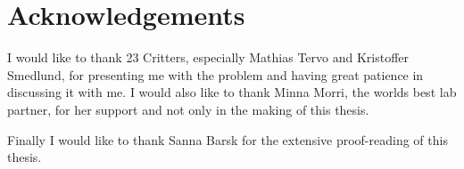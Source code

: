 \chapter{Acknowledgements}

I would like to thank 23 Critters, especially Mathias Tervo and Kristoffer Smedlund, for presenting me with the problem and having great patience in discussing it with me. I would also like to thank Minna Morri, the worlds best lab partner, for her support and not only in the making of this thesis. 

Finally I would like to thank Sanna Barsk for the extensive proof-reading of this thesis. 

